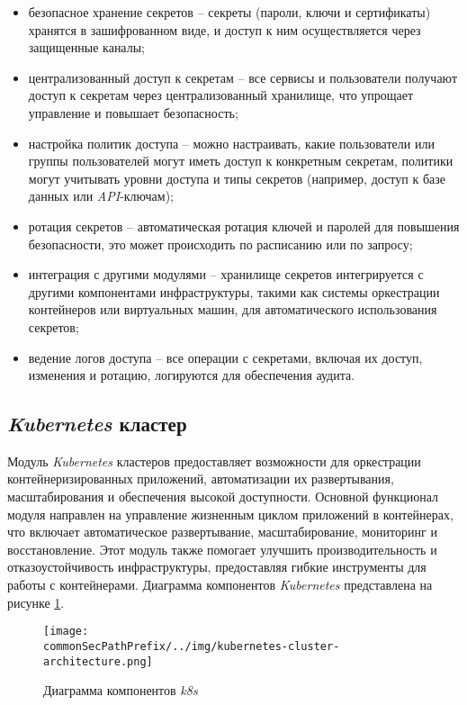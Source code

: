 \begin{itemize}
    \item безопасное хранение секретов -- секреты (пароли, ключи и сертификаты) хранятся в зашифрованном виде, и доступ к ним осуществляется через защищенные каналы; 
    \item централизованный доступ к секретам -- все сервисы и пользователи получают доступ к секретам через централизованный хранилище, что упрощает управление и повышает безопасность; 
    \item настройка политик доступа -- можно настраивать, какие пользователи или группы пользователей могут иметь доступ к конкретным секретам, политики могут учитывать уровни доступа и типы секретов (например, доступ к базе данных или \textit{API}-ключам); 
    \item ротация секретов -- автоматическая ротация ключей и паролей для повышения безопасности, это может происходить по расписанию или по запросу; 
    \item интеграция с другими модулями -- хранилище секретов интегрируется с другими компонентами инфраструктуры, такими как системы оркестрации контейнеров или виртуальных машин, для автоматического использования секретов; 
    \item ведение логов доступа -- все операции с секретами, включая их доступ, изменения и ротацию, логируются для обеспечения аудита. 
\end{itemize}

\subsection{\textit{Kubernetes} кластер}
\label{sec:kubernetes_cluster_functionality}

Модуль \textit{Kubernetes} кластеров предоставляет возможности для оркестрации контейнеризированных приложений, автоматизации их развертывания, масштабирования и обеспечения высокой доступности. Основной функционал модуля направлен на управление жизненным циклом приложений в контейнерах, что включает автоматическое развертывание, масштабирование, мониторинг и восстановление. Этот модуль также помогает улучшить производительность и отказоустойчивость инфраструктуры, предоставляя гибкие инструменты для работы с контейнерами. Диаграмма компонентов \textit{Kubernetes} представлена на рисунке \ref{fig:kubernetes_cluster_functionality:k8s_components}.
\begin{figure}[ht]
    \centering
    \texttt{[image: \\commonSecPathPrefix/../img/kubernetes-cluster-architecture.png]}
    \caption{Диаграмма компонентов \textit{k8s}}
    \label{fig:kubernetes_cluster_functionality:k8s_components}
\end{figure}

